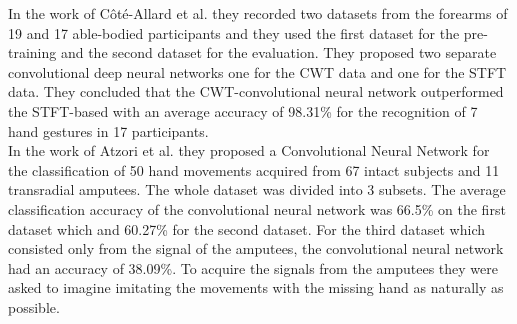 In the work of Côté-Allard et al. \cite{cote-allard_deep_2018} they recorded two datasets from the forearms of 19 and 17 able-bodied participants and they used the first dataset for the pre-training and the second dataset for the evaluation. They proposed two separate convolutional deep neural networks one for the CWT data and one for the STFT data. They concluded that the CWT-convolutional neural network outperformed the STFT-based with an average accuracy of 98.31\% for the recognition of 7 hand gestures in 17 participants.\\
In the work of Atzori et al. \cite{atzori_deep_2016} they proposed a Convolutional Neural Network for the classification of 50 hand movements acquired from 67 intact subjects and 11 transradial amputees. The whole dataset was divided into 3 subsets. The average classification accuracy of the convolutional neural network was 66.5\% on the first dataset which and 60.27\% for the second dataset. For the third dataset which consisted only from the signal of the amputees, the convolutional neural network had an accuracy of 38.09\%. To acquire the signals from the amputees they were asked to imagine imitating the movements with the missing hand as naturally as possible. 